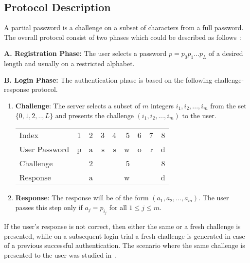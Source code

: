 \documentclass{llncs}
\begin{document}

\subsection{Protocol Description}

A partial password is a challenge on a subset of characters from
a full password.
The overall protocol consist of two phases which could be described as follows~\cite{FC13paper}:

\textbf{A. Registration Phase:} The
user selects a password $p=p_0p_1...p_L$ of a desired length and
usually on a restricted alphabet.


\textbf{B. Login Phase:} The authentication phase is based on the
following challenge-response protocol.

\begin{enumerate}
  \item \textbf{Challenge}:
  The server selects a subset of $m$ integers $i_1,i_2,...,i_m$ from the set $\{0,1,2,..,L\}$ and presents the challenge $(i_1,i_2,...,i_m)$ to the user.

 \begin{center}
\begin{tabular}{ l || c | r | r| r| r| r| r| r|}
Index &  1 & 2 & 3 & 4 & 5 & 6 & 7 &  8   \\
User Password &  p & a & s & s & w &  o &  r&  d  \\
\hline
Challenge &    & 2 &  &  & 5 &  &  &  8     \\
Response  &   & a &  &  & w &   &  &  d \\
\end{tabular}
\end{center}


  \item \textbf{Response}: The response will be of the form $(a_1,a_2,...,a_m)$. The user passes this step only if $a_j=p_{i_j}$ for all $1 \leq j \leq m$.
\end{enumerate}

\noindent If the user's response is not correct, then either
the same or a fresh challenge is presented, while on a subsequent
login trial a fresh challenge is generated in
case of a previous successful authentication. The scenario where the same challenge is presented to the user was studied in~\cite{CSGoring}.
\end{document}
